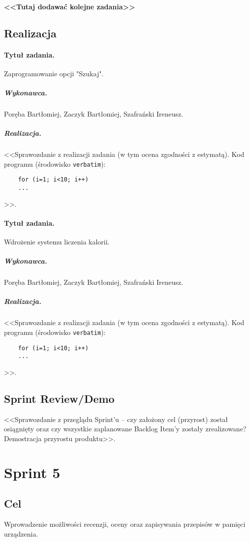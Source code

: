 \documentclass[a4paper]{article}
\begin{document}
	\paragraph{<<Tutaj dodawać kolejne zadania>>}
	
	\subsection{Realizacja}
	
	\paragraph{Tytuł zadania.} Zaprogramowanie opcji "Szukaj".
	\subparagraph{Wykonawca.} Poręba Bartłomiej, Zaczyk Bartłomiej, Szafrański Ireneusz.
	\subparagraph{Realizacja.} <<Sprawozdanie z realizacji zadania (w tym ocena zgodności z estymatą). Kod programu (środowisko \texttt{verbatim}): \begin{verbatim}
	for (i=1; i<10; i++)
	...
	\end{verbatim}>>.
	
	\paragraph{Tytuł zadania.} Wdrożenie systemu liczenia kalorii.
	\subparagraph{Wykonawca.} Poręba Bartłomiej, Zaczyk Bartłomiej, Szafrański Ireneusz.
	\subparagraph{Realizacja.} <<Sprawozdanie z realizacji zadania (w tym ocena zgodności z estymatą). Kod programu (środowisko \texttt{verbatim}): \begin{verbatim}
	for (i=1; i<10; i++)
	...
	\end{verbatim}>>.
	
	
	
	\subsection{Sprint Review/Demo}
	<<Sprawozdanie z przeglądu Sprint'u -- czy założony cel (przyrost) został osiągnięty oraz czy wszystkie zaplanowane Backlog Item'y zostały zrealizowane? Demostracja przyrostu produktu>>.
	
	
	\section{Sprint 5}
	
	\subsection{Cel} Wprowadzenie możliwości recenzji, oceny oraz zapisywania przepisów w pamięci urządzenia.
	
\end{document}
